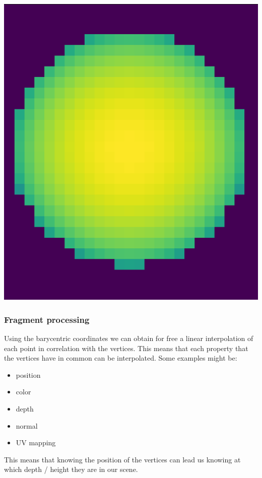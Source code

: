 \documentclass{article}
\begin{document}
\begin{center}
\begin{minipage}{0.45\textwidth}
        \includegraphics*[width=\linewidth]{../images/artifact_OFF.png}
    \end{minipage}
    \label{fig:artifacts}
\end{center}

\subsubsection{Fragment processing}
Using the barycentric coordinates we can obtain for free a linear interpolation of each point in correlation with the vertices. This means that each property that the vertices have in common can be interpolated. Some examples might be:
\begin{itemize}
    \item position
    \item color
    \item depth
    \item normal
    \item UV mapping
\end{itemize}
This means that knowing the position of the vertices can lead us knowing at which depth / height they are in our scene.
\end{document}
